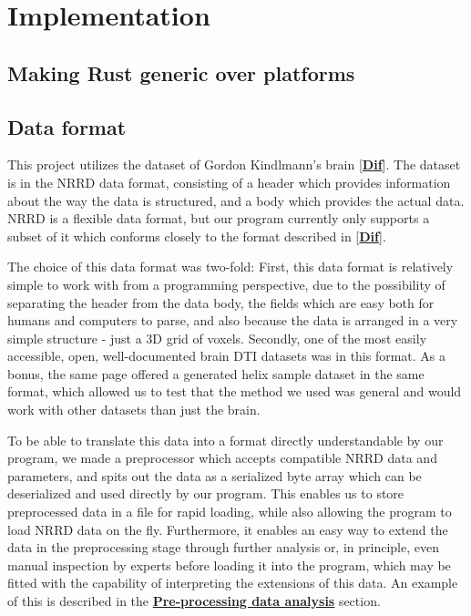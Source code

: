 \documentclass{article}
\newcommand{\reference}[1]{[\hyperref[ref:#1]{\textbf{#1}}]}
\newcommand{\secref}[2]{\hyperref[sec:#1]{\textbf{#2}}}
\begin{document}
\section*{Implementation}

\subsection*{Making Rust generic over platforms}


\subsection*{Data format}


This project utilizes the dataset of Gordon Kindlmann's brain \reference{Dif}. The dataset is in the NRRD data format, consisting of a header which provides information about the way the data is structured, and a body which provides the actual data. NRRD is a flexible data format, but our program currently only supports a subset of it which conforms closely to the format described in \reference{Dif}.

The choice of this data format was two-fold: First, this data format is relatively simple to work with from a programming perspective, due to the possibility of separating the header from the data body, the fields which are easy both for humans and computers to parse, and also because the data is arranged in a very simple structure - just a 3D grid of voxels. Secondly, one of the most easily accessible, open, well-documented brain DTI datasets was in this format. As a bonus, the same page offered a generated helix sample dataset in the same format, which allowed us to test that the method we used was general and would work with other datasets than just the brain.

To be able to translate this data into a format directly understandable by our program, we made a preprocessor which accepts compatible NRRD data and parameters, and spits out the data as a serialized byte array which can be deserialized and used directly by our program. This enables us to store preprocessed data in a file for rapid loading, while also allowing the program to load NRRD data on the fly. Furthermore, it enables an easy way to extend the data in the preprocessing stage through further analysis or, in principle, even manual inspection by experts before loading it into the program, which may be fitted with the capability of interpreting the extensions of this data. An example of this is described in the \secref{prepro}{Pre-processing data analysis} section.
\end{document}
